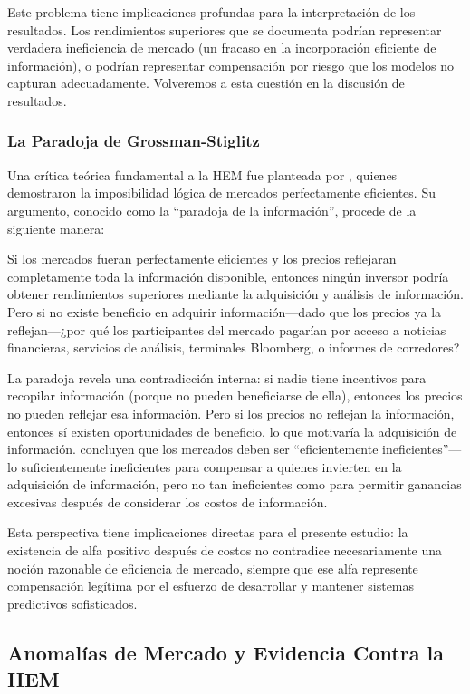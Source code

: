 \documentclass[11pt,a4paper]{article}
\begin{document}
Este problema tiene implicaciones profundas para la interpretación de los resultados. Los rendimientos superiores que se documenta podrían representar verdadera ineficiencia de mercado (un fracaso en la incorporación eficiente de información), o podrían representar compensación por riesgo que los modelos no capturan adecuadamente. Volveremos a esta cuestión en la discusión de resultados.

\subsubsection{La Paradoja de Grossman-Stiglitz}

Una crítica teórica fundamental a la HEM fue planteada por \citet{grossman1980}, quienes demostraron la imposibilidad lógica de mercados perfectamente eficientes. Su argumento, conocido como la ``paradoja de la información'', procede de la siguiente manera:

Si los mercados fueran perfectamente eficientes y los precios reflejaran completamente toda la información disponible, entonces ningún inversor podría obtener rendimientos superiores mediante la adquisición y análisis de información. Pero si no existe beneficio en adquirir información---dado que los precios ya la reflejan---¿por qué los participantes del mercado pagarían por acceso a noticias financieras, servicios de análisis, terminales Bloomberg, o informes de corredores?

La paradoja revela una contradicción interna: si nadie tiene incentivos para recopilar información (porque no pueden beneficiarse de ella), entonces los precios no pueden reflejar esa información. Pero si los precios no reflejan la información, entonces sí existen oportunidades de beneficio, lo que motivaría la adquisición de información. \citet{grossman1980} concluyen que los mercados deben ser ``eficientemente ineficientes''---lo suficientemente ineficientes para compensar a quienes invierten en la adquisición de información, pero no tan ineficientes como para permitir ganancias excesivas después de considerar los costos de información.

Esta perspectiva tiene implicaciones directas para el presente estudio: la existencia de alfa positivo después de costos no contradice necesariamente una noción razonable de eficiencia de mercado, siempre que ese alfa represente compensación legítima por el esfuerzo de desarrollar y mantener sistemas predictivos sofisticados.

\subsection{Anomalías de Mercado y Evidencia Contra la HEM}
\end{document}
